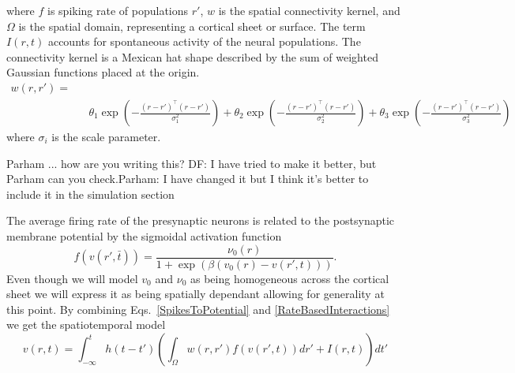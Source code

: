 \documentclass[onecolumn,draftcls]{IEEEtran}
\begin{document}
where $f$ is spiking rate of populations $r'$, $w$ is the spatial connectivity kernel, and $\Omega$ is the spatial domain, representing a cortical sheet or surface. The term $I\left(r,t\right)$ accounts for spontaneous activity of the neural populations. The connectivity kernel is a Mexican hat shape described by the sum of weighted Gaussian functions placed at the origin.
\begin{eqnarray}\label{Connectivity Kernel}
	w\left(r,r'\right) =&& \\
&&\theta_1\exp{\left(-\frac{(r-r')^\top(r-r')}{\sigma_1^2}\right)}+\theta_2\exp{\left(-\frac{(r-r')^\top(r-r')}{\sigma_2^2}\right)}+\theta_3\exp{\left(-\frac{(r-r')^\top(r-r')}{\sigma_3^2}\right)}\nonumber
\end{eqnarray}
where $\sigma_i$ is the scale parameter.
\begin{todo}
	{Parham ... how are you writing this? DF: I have tried to make it better, but Parham can you check.Parham: I have changed it but I think it's better to include it in the simulation section}
\end{todo}The average firing rate of the presynaptic neurons is related to the postsynaptic membrane potential by the sigmoidal activation function
\begin{equation}\label{ActivationFunction}
	f\left( v\left( r', \bar t \right) \right) = \frac{\nu _0\left(r\right)}{1 + \exp \left( \beta \left( v_0\left( r \right) - v\left(r',t\right) \right) \right)}.
\end{equation}
Even though we will model $v_0$ and $\nu_0$ as being homogeneous across the cortical sheet we will express it as being spatially dependant allowing for generality at this point. By combining Eqs.~\ref{SpikesToPotential} and \ref{RateBasedInteractions} we get the spatiotemporal model
\begin{equation}\label{FullDoubleIntModel}
	v\left(r,t\right) = \int_{-\infty}^t h\left(t - t'\right) \left(\int_\Omega   w\left(r,r'\right) f\left( v\left( r',t \right)\right)dr' + I(r,t) \right)dt'
\end{equation}
\end{document}
